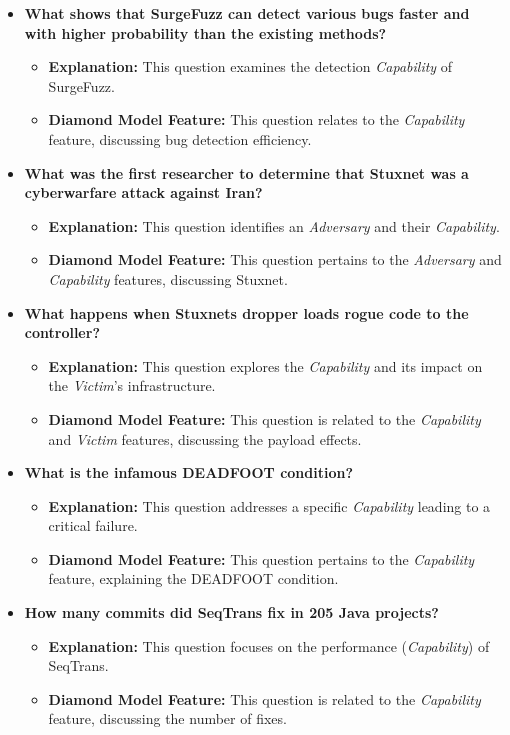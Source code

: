 \documentclass{article}
\begin{document}
\begin{itemize}
    \item \textbf{What shows that SurgeFuzz can detect various bugs faster and with higher probability than the existing methods?}
    \begin{itemize}
        \item \textbf{Explanation:} This question examines the detection \textit{Capability} of SurgeFuzz.
        \item \textbf{Diamond Model Feature:} This question relates to the \textit{Capability} feature, discussing bug detection efficiency.
    \end{itemize}

    \item \textbf{What was the first researcher to determine that Stuxnet was a cyberwarfare attack against Iran?}
    \begin{itemize}
        \item \textbf{Explanation:} This question identifies an \textit{Adversary} and their \textit{Capability}.
        \item \textbf{Diamond Model Feature:} This question pertains to the \textit{Adversary} and \textit{Capability} features, discussing Stuxnet.
    \end{itemize}

    \item \textbf{What happens when Stuxnets dropper loads rogue code to the controller?}
    \begin{itemize}
        \item \textbf{Explanation:} This question explores the \textit{Capability} and its impact on the \textit{Victim}'s infrastructure.
        \item \textbf{Diamond Model Feature:} This question is related to the \textit{Capability} and \textit{Victim} features, discussing the payload effects.
    \end{itemize}

    \item \textbf{What is the infamous DEADFOOT condition?}
    \begin{itemize}
        \item \textbf{Explanation:} This question addresses a specific \textit{Capability} leading to a critical failure.
        \item \textbf{Diamond Model Feature:} This question pertains to the \textit{Capability} feature, explaining the DEADFOOT condition.
    \end{itemize}

    \item \textbf{How many commits did SeqTrans fix in 205 Java projects?}
    \begin{itemize}
        \item \textbf{Explanation:} This question focuses on the performance (\textit{Capability}) of SeqTrans.
        \item \textbf{Diamond Model Feature:} This question is related to the \textit{Capability} feature, discussing the number of fixes.
    \end{itemize}


\end{itemize}
\end{document}
